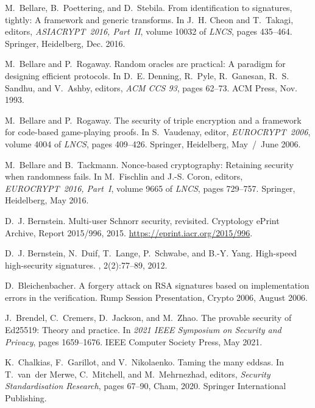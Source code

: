 \begin{thebibliography}{10}
M.~Bellare, B.~Poettering, and D.~Stebila.
\newblock From identification to signatures, tightly: {A} framework and generic
  transforms.
\newblock In J.~H. Cheon and T.~Takagi, editors, {\em ASIACRYPT~2016, Part~II},
  volume 10032 of {\em {LNCS}}, pages 435--464. Springer, Heidelberg, Dec.
  2016.

M.~Bellare and P.~Rogaway.
\newblock Random oracles are practical: {A} paradigm for designing efficient
  protocols.
\newblock In D.~E. Denning, R.~Pyle, R.~Ganesan, R.~S. Sandhu, and V.~Ashby,
  editors, {\em ACM CCS 93}, pages 62--73. {ACM} Press, Nov. 1993.

M.~Bellare and P.~Rogaway.
\newblock The security of triple encryption and a framework for code-based
  game-playing proofs.
\newblock In S.~Vaudenay, editor, {\em EUROCRYPT~2006}, volume 4004 of {\em
  {LNCS}}, pages 409--426. Springer, Heidelberg, May~/~June 2006.

M.~Bellare and B.~Tackmann.
\newblock Nonce-based cryptography: Retaining security when randomness fails.
\newblock In M.~Fischlin and J.-S. Coron, editors, {\em EUROCRYPT~2016,
  Part~I}, volume 9665 of {\em {LNCS}}, pages 729--757. Springer, Heidelberg,
  May 2016.

D.~J. Bernstein.
\newblock Multi-user {Schnorr} security, revisited.
\newblock Cryptology ePrint Archive, Report 2015/996, 2015.
\newblock \url{https://eprint.iacr.org/2015/996}.

D.~J. Bernstein, N.~Duif, T.~Lange, P.~Schwabe, and B.-Y. Yang.
\newblock High-speed high-security signatures.
, 2(2):77--89, 2012.

D.~Bleichenbacher.
\newblock A forgery attack on {RSA} signatures based on implementation errors
  in the verification.
\newblock Rump Session Presentation, Crypto 2006, August 2006.

J.~Brendel, C.~Cremers, D.~Jackson, and M.~Zhao.
\newblock The provable security of {Ed25519}: Theory and practice.
\newblock In {\em 2021 {IEEE} Symposium on Security and Privacy}, pages
  1659--1676. {IEEE} Computer Society Press, May 2021.

K.~Chalkias, F.~Garillot, and V.~Nikolaenko.
\newblock Taming the many eddsas.
\newblock In T.~van~der Merwe, C.~Mitchell, and M.~Mehrnezhad, editors, {\em
  Security Standardisation Research}, pages 67--90, Cham, 2020. Springer
  International Publishing.


\end{thebibliography}
